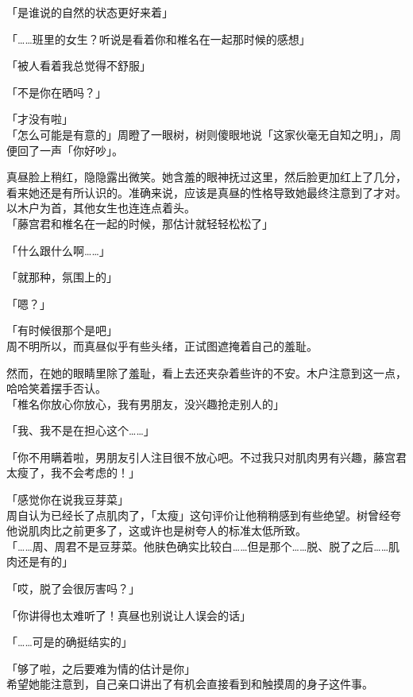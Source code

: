「是谁说的自然的状态更好来着」

「……班里的女生？听说是看着你和椎名在一起那时候的感想」

「被人看着我总觉得不舒服」

「不是你在晒吗？」

「才没有啦」\\

「怎么可能是有意的」周瞪了一眼树，树则傻眼地说「这家伙毫无自知之明」，周便回了一声「你好吵」。

真昼脸上稍红，隐隐露出微笑。她含羞的眼神抚过这里，然后脸更加红上了几分，看来她还是有所认识的。准确来说，应该是真昼的性格导致她最终注意到了才对。\\

以木户为首，其他女生也连连点着头。\\

「藤宫君和椎名在一起的时候，那估计就轻轻松松了」

「什么跟什么啊……」

「就那种，氛围上的」

「嗯？」

「有时候很那个是吧」\\

周不明所以，而真昼似乎有些头绪，正试图遮掩着自己的羞耻。

然而，在她的眼睛里除了羞耻，看上去还夹杂着些许的不安。木户注意到这一点，哈哈笑着摆手否认。\\

「椎名你放心你放心，我有男朋友，没兴趣抢走别人的」

「我、我不是在担心这个……」

「你不用瞒着啦，男朋友引人注目很不放心吧。不过我只对肌肉男有兴趣，藤宫君太瘦了，我不会考虑的！」

「感觉你在说我豆芽菜」\\

周自认为已经长了点肌肉了，「太瘦」这句评价让他稍稍感到有些绝望。树曾经夸他说肌肉比之前更多了，这或许也是树夸人的标准太低所致。\\

「……周、周君不是豆芽菜。他肤色确实比较白……但是那个……脱、脱了之后……肌肉还是有的」

「哎，脱了会很厉害吗？」

「你讲得也太难听了！真昼也别说让人误会的话」

「……可是的确挺结实的」

「够了啦，之后要难为情的估计是你」\\

希望她能注意到，自己亲口讲出了有机会直接看到和触摸周的身子这件事。

